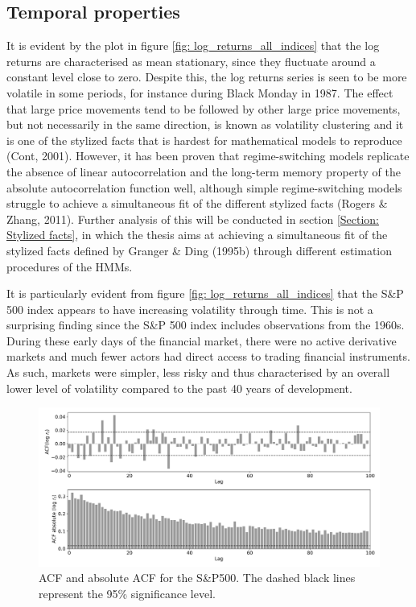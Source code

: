 \subsection{Temporal properties}
\label{subsection: temporal properties}
It is evident by the plot in figure \ref{fig: log_returns_all_indices} that the log returns are characterised as mean stationary, since they fluctuate around a constant level close to zero. Despite this, the log returns series is seen to be more volatile in some periods, for instance during Black Monday in 1987. The effect that large price movements tend to be followed by other large price movements, but not necessarily in the same direction, is known as volatility clustering and it is one of the stylized facts that is hardest for mathematical models to reproduce (Cont, 2001). However, it has been proven that regime-switching models replicate the absence of linear autocorrelation and the long-term memory property of the absolute autocorrelation function well, although simple regime-switching models struggle to achieve a simultaneous fit of the
different stylized facts (Rogers \& Zhang, 2011). Further analysis of this will be conducted in section \ref{Section: Stylized facts}, in which the thesis aims at achieving a simultaneous fit of the stylized facts defined by Granger \& Ding (1995b) through different estimation procedures of the HMMs.

It is particularly evident from figure \ref{fig: log_returns_all_indices} that the S\&P 500 index appears to have increasing volatility through time. This is not a surprising finding since the S\&P 500 index includes observations from the 1960s. During these early days of the financial market, there were no active derivative markets and much fewer actors had direct access to trading financial instruments. As such, markets were simpler, less risky and thus characterised by an overall lower level of volatility compared to the past 40 years of development.

\begin{figure}[H] 
    \centering
    \includegraphics[width=1\textwidth]{analysis/data_description/images/SP500_ACF.png}
    \caption{ACF and absolute ACF for the S\&P500. The dashed black lines represent the 95\% significance level.}
    \label{fig: ACF_all_log_returns}
\end{figure}

